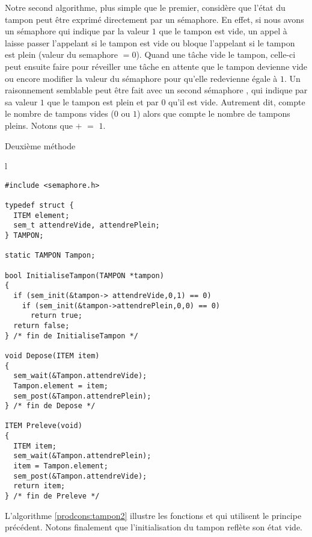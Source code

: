Notre second algorithme, plus simple que le premier, considère que l'état du tampon peut être exprimé directement par un sémaphore. En effet, si nous avons un sémaphore  qui indique par la valeur $1$ que le tampon est vide, un appel à  laisse passer l'appelant si le tampon est vide ou bloque l'appelant si le tampon est plein (valeur du semaphore $= 0$). Quand une tâche vide le tampon, celle-ci peut ensuite faire  pour réveiller une tâche en attente que le tampon devienne vide ou encore modifier la valeur du sémaphore pour qu'elle redevienne égale à $1$. Un raisonnement semblable peut être fait avec un second sémaphore , qui indique par sa valeur $1$ que le tampon est plein et par $0$ qu'il est vide. Autrement dit,  compte le nombre de tampons vides ($0$ ou $1$) alors que  compte le nombre de tampons pleins. Notons que  $+$  $=$ $1$.

\begin{algorithm}[h!t]
\caption{Deuxième méthode}\label{prodcons:tampon2}
\centering
\begin{tabular}{l}
\lstset{language=C++}
\begin{lstlisting}
#include <semaphore.h>

typedef struct {
  ITEM element;
  sem_t attendreVide, attendrePlein;
} TAMPON;

static TAMPON Tampon;

bool InitialiseTampon(TAMPON *tampon)
{
  if (sem_init(&tampon-> attendreVide,0,1) == 0)
    if (sem_init(&tampon->attendrePlein,0,0) == 0)
      return true;
  return false;
} /* fin de InitialiseTampon */

void Depose(ITEM item)
{
  sem_wait(&Tampon.attendreVide);
  Tampon.element = item;
  sem_post(&Tampon.attendrePlein);
} /* fin de Depose */

ITEM Preleve(void)
{
  ITEM item;
  sem_wait(&Tampon.attendrePlein);
  item = Tampon.element;
  sem_post(&Tampon.attendreVide);
  return item;
} /* fin de Preleve */
\end{lstlisting}
\end{tabular}

\end{algorithm}

L'algorithme \ref{prodcons:tampon2} illustre les fonctions  et  qui utilisent le principe précédent. Notons finalement que l'initialisation du tampon reflète son état vide.


